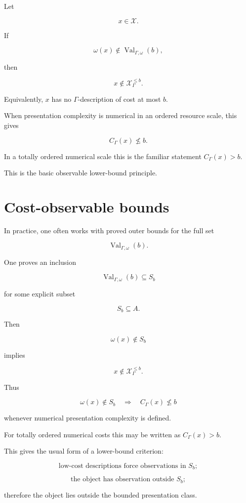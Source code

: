 \documentclass[11pt]{article}
\begin{document}
Let

\[
x\in\mathcal X.
\]

If

\[
\omega(x)\notin \operatorname{Val}_{\Gamma,\omega}(b),
\]

then

\[
x\notin \mathcal X_\Gamma^{\leq b}.
\]

Equivalently, \(x\) has no \(\Gamma\)-description of cost at most \(b\).

When presentation complexity is numerical in an ordered resource scale, this gives

\[
C_\Gamma(x)\nleq b.
\]

In a totally ordered numerical scale this is the familiar statement \(C_\Gamma(x)>b\).

This is the basic observable lower-bound principle.


\section{Cost-observable bounds}

In practice, one often works with proved outer bounds for the full set

\[
\operatorname{Val}_{\Gamma,\omega}(b).
\]

One proves an inclusion

\[
\operatorname{Val}_{\Gamma,\omega}(b)\subseteq S_b
\]

for some explicit subset

\[
S_b\subseteq A.
\]

Then

\[
\omega(x)\notin S_b
\]

implies

\[
x\notin \mathcal X_\Gamma^{\leq b}.
\]

Thus

\[
\omega(x)\notin S_b
\quad\Longrightarrow\quad
C_\Gamma(x)\nleq b
\]

whenever numerical presentation complexity is defined.

For totally ordered numerical costs this may be written as \(C_\Gamma(x)>b\).

This gives the usual form of a lower-bound criterion:

\[
\text{low-cost descriptions force observations in }S_b;
\]

\[
\text{the object has observation outside }S_b;
\]

therefore the object lies outside the bounded presentation class.
\end{document}
